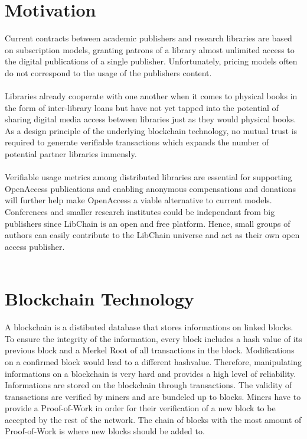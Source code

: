 \chapter{Motivation\label{cha:motivation}}
Current contracts between academic publishers and research libraries are based on subscription models, granting patrons of a library almost unlimited access to the digital publications of a single publisher. Unfortunately, pricing models often do not correspond to the usage of the publishers content. 
\\
\\
Libraries already cooperate with one another when it comes to physical books in the form of inter-library loans but have not yet tapped into the potential of sharing digital media access between libraries just as they would physical books. As a design principle of the underlying blockchain technology, no mutual trust is required to generate verifiable transactions which expands the number of potential partner libraries immensly.
\\
\\
Verifiable usage metrics among distributed libraries are essential for supporting OpenAccess publications and enabling anonymous compensations and donations will further help make OpenAccess a viable alternative to current models. Conferences and smaller research institutes could be independant from big publishers since LibChain is an open and free platform. Hence, small groups of authors can easily contribute to the LibChain universe and act as their own open access publisher.
\\
\\
\chapter{Blockchain Technology\label{cha:chapter1}}

A blockchain is a distibuted database that stores informations on linked blocks. To ensure the integrity of the information, every block includes a hash value of its previous block and a Merkel Root of all transactions in the block. Modifications on a confirmed block would lead to a different hashvalue. Therefore, manipulating informations on a blockchain is very hard and provides a high level of reliability.
Informations are stored on the blockchain through transactions. The validity of transactions are verified by miners and are bundeled up to blocks. Miners have to provide a Proof-of-Work in order for their verification of a new block to be accepted by the rest of the network. The chain of blocks with the most amount of Proof-of-Work is where new blocks should be added to. 

